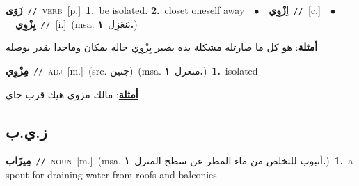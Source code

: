 \documentclass[10pt,a4paper,twoside]{article} %
\begin{document}
\begin{multicols}{2}
{\setlength\topsep{0pt}\textbf{\foreignlanguage{arabic}{زَوَى}}\ {\color{gray}\texttt{//}\color{black}}\ \textsc{verb}\ [p.]\ \textbf{1.}~be isolated.  \textbf{2.}~closet oneself away\ \ $\bullet$\ \ \setlength\topsep{0pt}\textbf{\foreignlanguage{arabic}{اِزْوِي}}\ {\color{gray}\texttt{//}\color{black}}\ [c.]\ \ $\bullet$\ \ \setlength\topsep{0pt}\textbf{\foreignlanguage{arabic}{يِزْوِي}}\ {\color{gray}\texttt{//}\color{black}}\ [i.]\ \color{gray}(msa. \foreignlanguage{arabic}{يَنعَزِل}~\foreignlanguage{arabic}{\textbf{١.}})\color{black}\  \begin{flushright}\color{gray}\foreignlanguage{arabic}{\textbf{\underline{\foreignlanguage{arabic}{أمثلة}}}: هو كل ما صارتله مشكلة بده يصير يِزْوِي حاله بمكان وماحدا يقدر يوصله}\end{flushright}\color{black}} \vspace{2mm}

{\setlength\topsep{0pt}\textbf{\foreignlanguage{arabic}{مِزْوِي}}\ {\color{gray}\texttt{//}\color{black}}\ \textsc{adj}\ [m.]\ (src. \color{gray}\foreignlanguage{arabic}{جنين}\color{black})\ \color{gray}(msa. \foreignlanguage{arabic}{منعزل}~\foreignlanguage{arabic}{\textbf{١.}})\color{black}\ \textbf{1.}~isolated\  \begin{flushright}\color{gray}\foreignlanguage{arabic}{\textbf{\underline{\foreignlanguage{arabic}{أمثلة}}}: مالك مزوي هيك قرب جاي}\end{flushright}\color{black}} \vspace{2mm}

\vspace{-3mm}
\subsection*{\color{blue}\foreignlanguage{arabic}{ز.ي.ب}\color{blue}{}} 

{\setlength\topsep{0pt}\textbf{\foreignlanguage{arabic}{مِيزَاب}}\ {\color{gray}\texttt{//}\color{black}}\ \textsc{noun}\ [m.]\ \color{gray}(msa. \foreignlanguage{arabic}{أنبوب للتخلص من ماء المطر عن سطح المنزل}~\foreignlanguage{arabic}{\textbf{١.}})\color{black}\ \textbf{1.}~a spout for draining water from roofs and balconies\ } \vspace{2mm}


\end{multicols}
\end{document}
